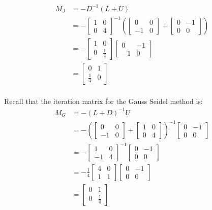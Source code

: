 \documentclass{article}
\begin{document}
$$\begin{align*}
M_J&=-D^{-1}(L+U)\\
&=-\begin{bmatrix}
1&0\\0&4
\end{bmatrix}^{-1}
\left(\begin{bmatrix}
0&0\\-1&0
\end{bmatrix}+
\begin{bmatrix}
0&-1\\0&0
\end{bmatrix}\right)\\
&=-\begin{bmatrix}
1&0\\0&\frac{1}{4}
\end{bmatrix}
\begin{bmatrix}
0&-1\\-1&0
\end{bmatrix}\\
&=\begin{bmatrix}
0&1\\\frac{1}{4}&0
\end{bmatrix}
\end{align*}$$
\\

Recall that the iteration matrix for the Gauss Seidel method is:
$$\begin{align*}
M_G&=-(L+D)^{-1}U\\
&=-\left(\begin{bmatrix}
0&0\\-1&0
\end{bmatrix}+
\begin{bmatrix}
1&0\\0&4
\end{bmatrix}\right)^{-1}
\begin{bmatrix}
0&-1\\0&0
\end{bmatrix}\\
&=-\begin{bmatrix}
1&0\\-1&4
\end{bmatrix}^{-1}
\begin{bmatrix}
0&-1\\0&0
\end{bmatrix}\\
&=-\frac{1}{4}\begin{bmatrix}
4&0\\1&1
\end{bmatrix}
\begin{bmatrix}
0&-1\\0&0
\end{bmatrix}\\
&=\begin{bmatrix}
0&1\\0&\frac{1}{4}
\end{bmatrix}
\end{align*}$$
\end{document}

